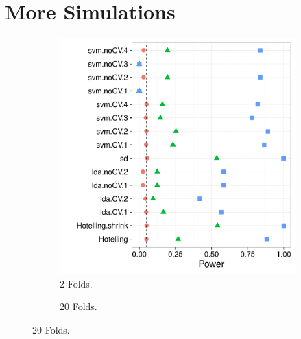 \documentclass[12pt,a4paper]{article}
\begin{document}
\section{More Simulations}


\begin{figure}[h]
\centering
\label{fig:simulation_1}
\caption{\footnotesize [TODO].}	

	\begin{subfigure}{.5\textwidth}
	  \centering
	  \includegraphics[width=1\linewidth]{"art/2016-07-27 21:21:12"}
	  \caption{2 Folds.}  %
	\label{fig:2016-07-2721:21:12}
	\end{subfigure}%
	\begin{subfigure}{.5\textwidth}
	  \centering
	  \caption{20 Folds.} %
	\end{subfigure}
	
\end{figure}
\end{document}
